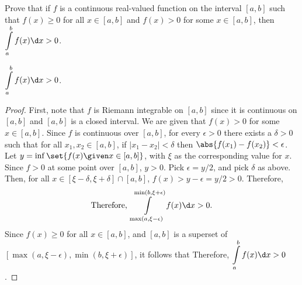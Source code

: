 \begin{problem}
  Prove that if $f$ is a continuous real-valued function on the interval
  $[a, b]$ such that $f(x) \geq 0$ for all $x \in [a, b]$ and
  $f(x) > 0$ for some $x \in [a, b]$, then $\displaystyle \int\limits_a^b f(x) \d x > 0$.
\end{problem}

  \begin{claim}
    $\displaystyle \int\limits_a^b f(x) \d x > 0$.
  \end{claim}  
  \begin{proof}
    First, note that $f$ is Riemann integrable on $[a, b]$ since it is continuous
    on $[a, b]$ and $[a, b]$ is a closed interval.
    We are given that $f(x) > 0$ for some $x \in [a, b]$.
    Since $f$ is continuous over $[a, b]$,
    for every $\epsilon > 0$ there exists a $\delta > 0$
    such that for all $x_1, x_2 \in [a, b]$, if $|x_1 - x_2| < \delta$
    then $\abs{f(x_1) - f(x_2)} < \epsilon$.
    Let $y = \inf\set{f(x) \given x \in [a, b]}$, with $\xi$ as the corresponding
    value for $x$. Since $f > 0$ at some point over $[a, b]$, $y > 0$.
    Pick $\epsilon = y/2$, and pick $\delta$ as above.
    Then, for all $x \in [\xi - \delta, \xi + \delta] \cap [a, b]$,
    $f(x) > y - \epsilon = y/2 > 0$.
    Therefore,
    \[ \text{Therefore, }\int\limits_{\max (a, \xi - \epsilon)}^{\min(b, \xi + \epsilon)} f(x) \d x > 0. \]
    Since $f(x) \geq 0$ for all $x \in [a, b]$, and $[a, b]$ is a superset
    of $[\max (a, \xi - \epsilon), \min(b, \xi + \epsilon)]$, it follows that
    Therefore, $\displaystyle \int\limits_a^b f(x) \d x > 0$.
  \end{proof}
